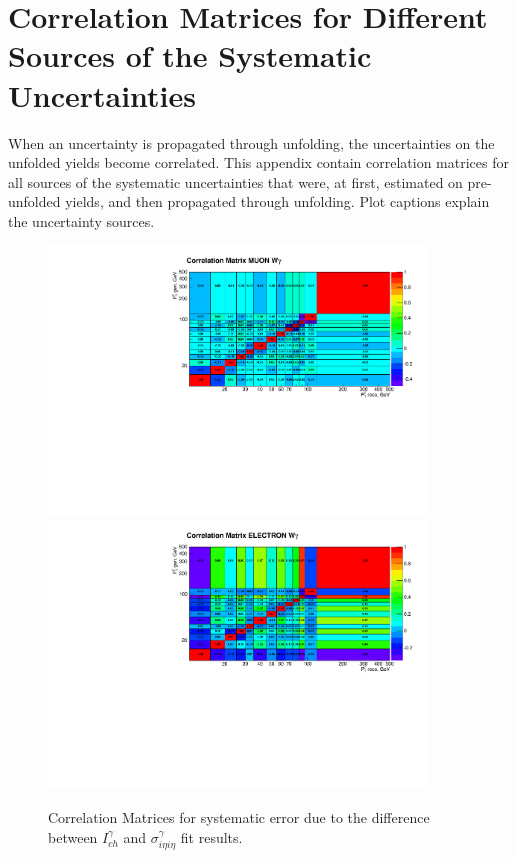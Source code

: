 \chapter{Correlation Matrices for Different Sources of the Systematic Uncertainties}
\label{sec:corrMatrices}

When an uncertainty is propagated through unfolding, the uncertainties on the unfolded yields become correlated. This appendix contain correlation matrices for all sources of the systematic uncertainties that were, at first, estimated on pre-unfolded yields, and then propagated through unfolding. Plot captions explain the uncertainty sources.

\begin{figure}[htb]
  \begin{center}
   \includegraphics[width=0.90\textwidth]{../figs/figs_v11/MUON_WGamma/Constants/matrCorrelation_syst_CHISOvsSIHIH.pdf}\\
\includegraphics[width=0.90\textwidth]{../figs/figs_v11/ELECTRON_WGamma/Constants/matrCorrelation_syst_CHISOvsSIHIH.pdf}
  \caption{Correlation Matrices for systematic error due to the difference between $I_{ch}^{\gamma}$ and $\sigma_{i\eta i\eta}^{\gamma}$ fit results.}
  \label{fig:corrMatrices_syst_CHISOvsSIHIH_Wg}
  \end{center}
\end{figure}

